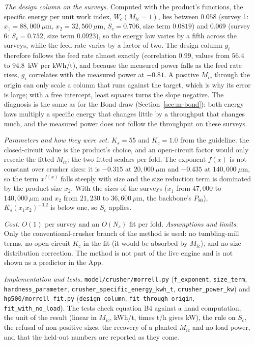 \emph{The design column on the surveys.} Computed with the product's functions, the specific energy per unit work index,
$W_c(M_{ic}=1)$, lies between $0.058$ (survey 1: $x_1=88{,}000~\mu$m, $x_2=32{,}560~\mu$m, $S_c=0.706$, size term $0.0819$) and $0.069$ (survey 6:
$S_c=0.752$, size term $0.0923$), so the energy law varies by a fifth across the surveys, while the feed rate varies by a factor of two. The design
column $g_i$ therefore follows the feed rate almost exactly (correlation $0.99$, values from $56.4$ to $94.8$~kW per kWh/t), and because the
measured power falls as the feed rate rises, $g_i$ correlates with the measured power at $-0.81$. A positive $M_{ic}$ through the origin can only
scale a column that runs against the target, which is why its error is large; with a free intercept, least squares turns the slope negative.
The diagnosis is the same as for the Bond draw (Section~\ref{sec:m-bond}): both energy laws multiply a specific energy that changes little by a
throughput that changes much, and the measured power does not follow the throughput on these surveys.

\emph{Parameters and how they were set.} $K_s=55$ and $K_{\mathrm c}=1.0$ from the guideline; the closed-circuit value is the product's choice, and an
open-circuit factor would only rescale the fitted $M_{ic}$; the two fitted scalars per fold. The exponent $f(x)$ is not constant over crusher sizes: it is $-0.315$ at $20{,}000~\mu$m and $-0.435$ at $140{,}000~\mu$m, so the term
$x^{f(x)}$ falls steeply with size and the size reduction term is dominated by the product size $x_2$. With the sizes of the surveys ($x_1$ from $47{,}000$ to
$140{,}000~\mu$m and $x_2$ from $21{,}230$ to $36{,}600~\mu$m, the backbone's $P_{80}$), $K_s(x_1x_2)^{-0.2}$ is below one, so $S_c$ applies.

\emph{Cost.} $O(1)$ per survey and an $O(N_s)$ fit per fold. \emph{Assumptions and limits.} Only the conventional-crusher branch of the method
is used: no tumbling-mill terms, no open-circuit $K_{\mathrm c}$ in the fit (it would be absorbed by $M_{ic}$), and no size-distribution correction.
The method is not part of the live engine and is not shown as a predictor in the App.

\emph{Implementation and tests.} \texttt{model/\allowbreak{}crusher/\allowbreak{}morrell.py} (\texttt{f\_exponent}, \texttt{size\_term}, \texttt{hardness\_parameter},
\texttt{crusher\_specific\_energy\_kwh\_t}, \texttt{crusher\_power\_kw}) and \texttt{hp500/\allowbreak{}morrell\_fit.py} (\texttt{design\_column},
\texttt{fit\_through\_origin}, \texttt{fit\_with\_no\_load}). The tests check equation B4 against a hand computation, the unit of the result
(linear in $M_{ic}$, kWh/t, times t/h gives kW), the rule on $S_c$, the refusal of non-positive sizes, the recovery of a planted $M_{ic}$ and
no-load power, and that the held-out numbers are reported as they come.

